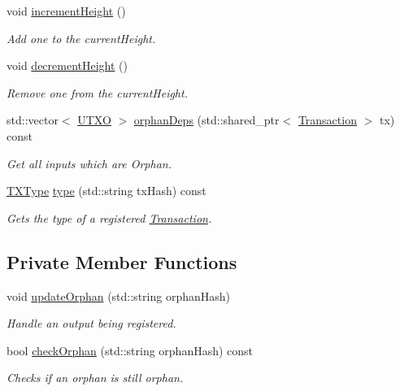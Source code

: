 \begin{DoxyCompactItemize}
void \mbox{\hyperlink{classMempool_ad6bb7b0310265f592a29ff9a06656333}{increment\+Height}} ()
\begin{DoxyCompactList}\small\item\em Add one to the current\+Height. \end{DoxyCompactList}\item 
void \mbox{\hyperlink{classMempool_a6306559877a38806f0a3a90aa87f8655}{decrement\+Height}} ()
\begin{DoxyCompactList}\small\item\em Remove one from the current\+Height. \end{DoxyCompactList}\item 
std\+::vector$<$ \mbox{\hyperlink{utxo_8hpp_a19091d002da03ec92277e19295ac4540}{U\+T\+XO}} $>$ \mbox{\hyperlink{classMempool_a54749b3d653ebd1db396fefb1bfc137c}{orphan\+Deps}} (std\+::shared\+\_\+ptr$<$ \mbox{\hyperlink{classTransaction}{Transaction}} $>$ tx) const
\begin{DoxyCompactList}\small\item\em Get all inputs which are Orphan. \end{DoxyCompactList}\item 
\mbox{\hyperlink{transaction_8hpp_a379269e60c4ed3fb09a01778f31ddaad}{T\+X\+Type}} \mbox{\hyperlink{classMempool_a216beee85149f61c603ef8ad5cdd8ef5}{type}} (std\+::string tx\+Hash) const
\begin{DoxyCompactList}\small\item\em Gets the type of a registered \mbox{\hyperlink{classTransaction}{Transaction}}. \end{DoxyCompactList}\end{DoxyCompactItemize}
\subsection*{Private Member Functions}
\begin{DoxyCompactItemize}
\item 
void \mbox{\hyperlink{classMempool_ae658e1104b650fbc63786bc5e77fb328}{update\+Orphan}} (std\+::string orphan\+Hash)
\begin{DoxyCompactList}\small\item\em Handle an output being registered. \end{DoxyCompactList}\item 
bool \mbox{\hyperlink{classMempool_a589b0f1f4f88862bab6627771574e297}{check\+Orphan}} (std\+::string orphan\+Hash) const
\begin{DoxyCompactList}\small\item\em Checks if an orphan is still orphan. \end{DoxyCompactList}\end{DoxyCompactItemize}
